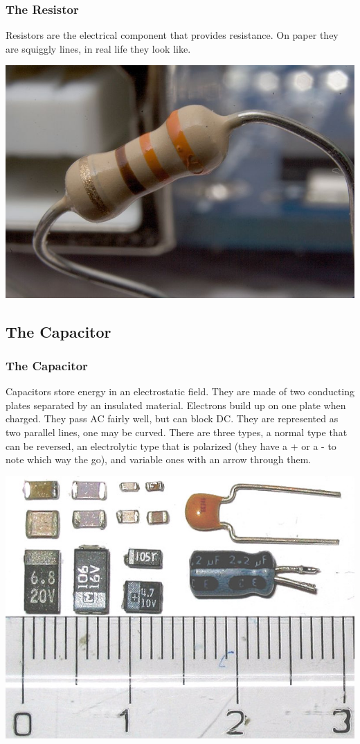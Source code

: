 \documentclass[10pt, handout]{beamer}
\begin{document}
\begin{frame}
\frametitle{The Resistor}
Resistors are the electrical component that provides resistance. On paper they are squiggly lines, in real life they look like.\\\pause
\begin{center}
\includegraphics[height=.8\textheight]{resistor.jpg}
\end{center}
\end{frame}

\subsection{The Capacitor}

\begin{frame}
\frametitle{The Capacitor}
Capacitors store energy in an electrostatic field. They are made of two conducting plates separated by an insulated material. Electrons build up on one plate when charged. They pass AC fairly well, but can block DC. They are represented as two parallel lines, one may be curved. There are three types, a normal type that can be reversed, an electrolytic type that is polarized (they have a + or a - to note which way the go), and variable ones with an arrow through them.\\\pause
\begin{center}
\includegraphics[height=.5\textheight]{capacitor.jpg}
\end{center}
\end{frame}
\end{document}
